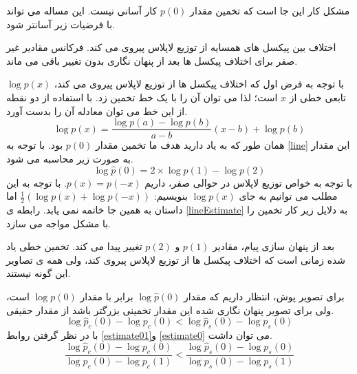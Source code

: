 مشکل کار این جا است که تخمین مقدار $ p(0) $ کار آسانی نیست. این مساله  می تواند با فرضیات زیر آسانتر شود.
\begin{itemize}
اختلاف بین پیکسل های همسایه از توزیع لاپلاس پیروی می کند.
فرکانس مقادیر غیر صفر برای اختلاف پیکسل ها بعد از پنهان نگاری بدون تغییر باقی می ماند.
\end{itemize}
با توجه به فرض اول که اختلاف پیکسل ها از توزیع لاپلاس پیروی می کند، $ \log p(x) $ تابعی خطی از $ x $ است؛ لذا می توان آن را با یک خط تخمین زد. با استفاده از دو نقطه از این خط می توان معادله آن را بدست آورد.
\begin{equation}
\label{line}
\log p(x)=\frac{\log p(a)-\log p(b)}{a-b}(x-b)+\log p(b)
\end{equation}
همان طور که به یاد دارید هدف ما تخمین مقدار $ p(0) $ بود. با توجه به \ref{line} این مقدار به صورت زیر محاسبه می شود.
\begin{equation}
\label{lineEstimate}
\log \hat{p}(0)=2\times \log p(1)-\log p(2)
\end{equation}
با توجه به خواص توزیع لاپلاس در حوالی صفر، داریم $ p(x)=p(-x) $. با توجه به این مطلب می توانیم به جای $ \log p(x) $ بنویسیم:
$\frac{1}{2}(\log p(x)+\log p(-x))  $
اما داستان به همین جا خاتمه نمی یابد. رابطه ی \ref{lineEstimate} به دلایل زیر کار تخمین را با مشکل مواجه می سازد.
\begin{itemize}
\nfeat
بعد از پنهان سازی پیام، مقادیر $ p(1) $ و $ p(2) $ تغییر پیدا می کند. 
\nfeat
تخمین خطی یاد شده زمانی است که اختلاف پیکسل ها از توزیع لاپلاس پیروی کند، ولی همه ی تصاویر این گونه نیستند. 
\end{itemize}
برای تصویر پوش، انتظار داریم که مقدار $ \log \hat{p}(0) $ برابر با مقدار $ \log p(0) $ است، ولی برای تصویر پنهان نگاری شده این مقدار تخمینی بزرگتر باشد از مقدار حقیقی.
\begin{equation}
\label{estimate0}
\log\hat{p}_{c}(0)-\log p_{c}(0)<\log\hat{p}_{s}(0)-\log p_{s}(0)
\end{equation}
با در نظر گرفتن روابط \ref{estimate01}و \ref{estimate0}  می توان داشت.
\begin{equation}
\frac{\log\hat{p}_{c}(0)-\log p_{c}(0)}{\log p_{c}(0)-\log p_{c}(1)}<
\frac{\log\hat{p}_{s}(0)-\log p_{s}(0)}{\log p_{s}(0)-\log p_{s}(1)}
\end{equation}

